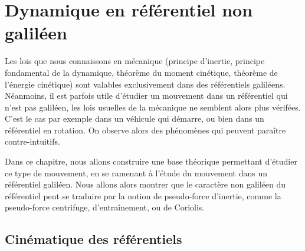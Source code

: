 \documentclass[11pt,fleqn]{book} %
\begin{document}










\setcounter{chapter}{20}

\chapter{Dynamique en référentiel non galiléen}

Les lois que nous connaissons en mécanique (principe d'inertie, principe fondamental de la dynamique, théorème du moment cinétique, théorème de l'énergie cinétique) sont valables exclusivement dans des référentiels galiléens. Néanmoins, il est parfois utile d'étudier un mouvement dans un référentiel qui n'est pas galiléen, les lois usuelles de la mécanique ne semblent alors plus vérifées. C'est le cas par exemple dans un véhicule qui démarre, ou bien dans un référentiel en rotation. On observe alors des phénomènes qui peuvent paraître contre-intuitifs.

Dans ce chapitre, nous allons construire une base théorique permettant d'étudier ce type de mouvement, en se ramenant à l'étude du mouvement dans un référentiel galiléen. Nous allons alors montrer que le caractère non galiléen du référentiel peut se traduire par la notion de pseudo-force d'inertie, comme la pseudo-force centrifuge, d'entraînement, ou de Coriolis.

\section{Cinématique des référentiels}
\end{document}
